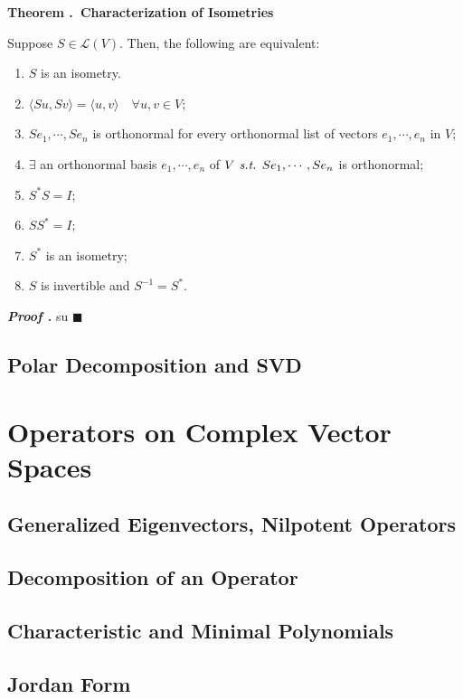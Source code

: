 \documentclass[11pt, letterpaper]{article}
\newcounter{index}[subsection]
\newenvironment*{thm}[1]{\begin{tcolorbox}\par\noindent\textbf{Theorem \thesubsection.\stepcounter{index}\theindex\ #1} \par}{\par\end{tcolorbox}}
\newcounter{nprf}[subsection]
\newenvironment*{prf}{\par\indent\textbf{\textit{Proof \stepcounter{nprf}\thenprf.}}}{\hfill$\blacksquare$\par}
\def\L{\mathcal{L}}
\def\st{\emph{ s.t. }}
\begin{document}
\begin{thm}{Characterization of Isometries}
	Suppose $S\in\L(V)$. Then, the following are equivalent: 
	\begin{enumerate}
		\item $S$ is an isometry.
		\item $\langle Su,Sv\rangle=\langle u,v\rangle\quad\forall u,v\in V$;
		\item $Se_1,\cdots,Se_n$ is orthonormal for every orthonormal list of vectors $e_1,\cdots,e_n$ in $V$;
		\item $\exists$ an orthonormal basis $e_1,\cdots,e_n$ of $V\st Se_1,\cdots,Se_n$ is orthonormal;
		\item $S^*S=I$;
		\item $SS^*=I$;
		\item $S^*$ is an isometry;
		\item $S$ is invertible and $S^{-1}=S^*$.
	\end{enumerate}	
\end{thm}
\begin{prf}
	su	
\end{prf}


\newpage
\subsection{Polar Decomposition and SVD}

\newpage
\section{Operators on Complex Vector Spaces}
\subsection{Generalized Eigenvectors, Nilpotent Operators}

\newpage
\subsection{Decomposition of an Operator}

\newpage
\subsection{Characteristic and Minimal Polynomials}

\newpage
\subsection{Jordan Form}
\end{document}
